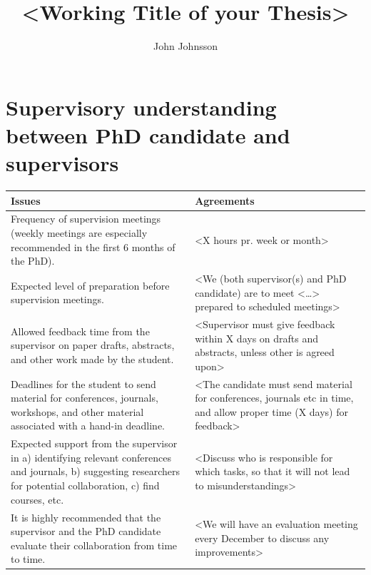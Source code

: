 \documentclass{uiaphd}
\author{John Johnsson}
\title{<Working Title of your Thesis>}
\begin{document}
	\maketitlepage
	
	\infosection
	
	\section*{Supervisory understanding between PhD candidate and supervisors}
	{\renewcommand{\arraystretch}{1.1}%
		\noindent
		\begin{longtable}{|p{}|p{}|}
			\hline
			\textbf{Issues} & \textbf{Agreements} \\ \hline
			Frequency of supervision meetings (weekly meetings are especially recommended in the first 6 months of the PhD).
			& <X hours pr. week or month> \\
			\hline
			Expected level of preparation before supervision meetings. 
			& <We (both supervisor(s) and PhD candidate) are to meet <…> prepared to scheduled meetings> \\
			\hline
			Allowed feedback time from the supervisor on paper drafts, abstracts, and other work made by the student.
			& <Supervisor must give feedback within X days on drafts and abstracts, unless other is agreed upon> \\
			\hline
			Deadlines for the student to send material for conferences, journals, workshops, and other material associated with a hand-in deadline.
			& <The candidate must send material for conferences, journals etc in time, and allow proper time (X days) for feedback> \\
			\hline
			Expected support from the supervisor in a) identifying relevant conferences and journals, b) suggesting researchers for potential collaboration, c) find courses, etc.
			& <Discuss who is responsible for which tasks, so that it will not lead to misunderstandings> \\
			\hline
			It is highly recommended that the supervisor and the PhD candidate evaluate their collaboration from time to time.
			& <We will have an evaluation meeting every December to discuss any improvements> \\
			\hline
		\end{longtable}
	} \tablerule
	
	\agreementchecklist
	
\end{document}
